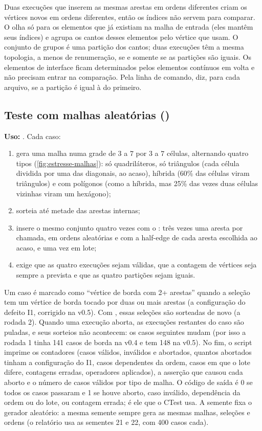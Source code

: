 Duas execuções que inserem as mesmas arestas em ordens diferentes criam os vértices novos em ordens diferentes, então os
índices não servem para comparar. O  olha só para os elementos que já existiam na malha de entrada
(eles mantêm seus índices) e agrupa os cantos desses elementos pelo vértice que usam. O conjunto de grupos é uma partição
dos cantos; duas execuções têm a mesma topologia, a menos de renumeração, se e somente se as partições são iguais. Os
elementos de interface ficam determinados pelos elementos contínuos em volta e não precisam entrar na comparação. Pela
linha de comando,  diz, para cada arquivo, se a partição é igual à do
primeiro.

\subsection{Teste com malhas aleatórias ()}

\textbf{Uso:} . Cada caso:
\begin{enumerate}
\item gera uma malha numa grade de $3$ a $7$ por $3$ a $7$ células, alternando quatro tipos (\cref{fig:estresse-malhas}):
só quadriláteros, só triângulos (cada célula dividida por uma das diagonais, ao acaso), híbrida (60\% das células viram
triângulos) e com polígonos (como a híbrida, mas 25\% das vezes duas células vizinhas viram um hexágono);
\item sorteia até metade das arestas internas;
\item insere o mesmo conjunto quatro vezes com o : três vezes uma aresta por chamada, em ordens aleatórias e
com a half-edge de cada aresta escolhida ao acaso, e uma vez em lote;
\item exige que as quatro execuções sejam válidas, que a contagem de vértices seja sempre a prevista e que as quatro
partições sejam iguais.
\end{enumerate}
Um caso é marcado como ``vértice de borda com 2+ arestas'' quando a seleção tem um vértice de borda tocado por duas ou
mais arestas (a configuração do defeito I1, corrigido na v0.5). Com , essas seleções são
sorteadas de novo (a rodada 2). Quando uma execução aborta, as execuções restantes do caso são puladas, e seus sorteios
não acontecem: os casos seguintes mudam (por isso a rodada 1 tinha 141 casos de borda na v0.4 e tem 148 na v0.5). No
fim, o script imprime os contadores (casos válidos, inválidos e abortados, quantos abortados tinham a configuração do I1,
casos dependentes da ordem, casos em que o lote difere, contagens erradas, operadores aplicados), a asserção que causou
cada aborto e o número de casos válidos por tipo de malha. O código de saída é 0 se todos os casos passaram e 1 se
houve aborto, caso inválido, dependência da ordem ou do lote, ou contagem errada; é ele que o CTest usa. A semente fixa
o gerador aleatório: a mesma semente sempre gera as mesmas malhas, seleções e ordens (o relatório usa as sementes 21 e
22, com 400 casos cada).

